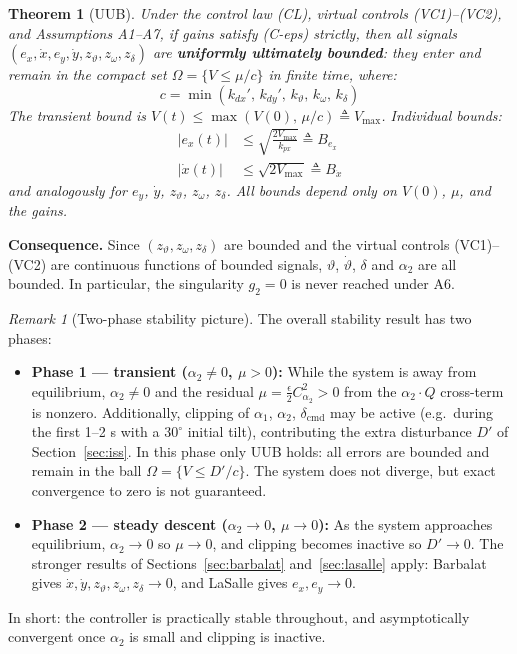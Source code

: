 \documentclass[11pt,a4paper]{article}
\theoremstyle{plain}
\newtheorem{theorem}{Theorem}[section]
\theoremstyle{remark}
\newtheorem{remark}{Remark}[section]
\newcommand{\vth}{\vartheta}
\newcommand{\zth}{z_{\vth}}
\newcommand{\zom}{z_{\omega}}
\newcommand{\zdel}{z_{\delta}}
\newcommand{\dcmd}{\delta_{\mathrm{cmd}}}
\begin{document}
\begin{theorem}[UUB]
Under the control law (CL), virtual controls (VC1)--(VC2), and Assumptions A1--A7, if gains satisfy (C-eps) strictly, then all signals $(e_x, \dot x, e_y, \dot y, \zth, \zom, \zdel)$ are \textbf{uniformly ultimately bounded}: they enter and remain in the compact set $\Omega = \{V \leq \mu/c\}$ in finite time, where:
\[
  c = \min(k_{dx}',\, k_{dy}',\, k_\vth,\, k_\omega,\, k_\delta)
\]
The transient bound is $V(t) \leq \max(V(0),\, \mu/c) \triangleq V_{\max}$. Individual bounds:
\begin{align}
  |e_x(t)| &\leq \sqrt{\frac{2V_{\max}}{k_{px}}} \triangleq B_{e_x} \\
  |\dot x(t)| &\leq \sqrt{2V_{\max}} \triangleq B_{\dot x}
\end{align}
and analogously for $e_y$, $\dot y$, $\zth$, $\zom$, $\zdel$. All bounds depend only on $V(0)$, $\mu$, and the gains.
\end{theorem}

\textbf{Consequence.} Since $(\zth, \zom, \zdel)$ are bounded and the virtual controls (VC1)--(VC2) are continuous functions of bounded signals, $\vth$, $\dot\vth$, $\delta$ and $\alpha_2$ are all bounded. In particular, the singularity $g_2 = 0$ is never reached under A6.

\begin{remark}[Two-phase stability picture]
The overall stability result has two phases:
\begin{itemize}
  \item \textbf{Phase 1 --- transient ($\alpha_2 \neq 0$, $\mu > 0$):} While the system is away from equilibrium, $\alpha_2 \neq 0$ and the residual $\mu = \tfrac{\epsilon}{2}C_{\alpha_2}^2 > 0$ from the $\alpha_2 \cdot Q$ cross-term is nonzero. Additionally, clipping of $\alpha_1$, $\alpha_2$, $\dcmd$ may be active (e.g.\ during the first 1--2 s with a $30^{\circ}$ initial tilt), contributing the extra disturbance $D'$ of Section~\ref{sec:iss}. In this phase only UUB holds: all errors are bounded and remain in the ball $\Omega = \{V \leq D'/c\}$. The system does not diverge, but exact convergence to zero is not guaranteed.
  \item \textbf{Phase 2 --- steady descent ($\alpha_2 \to 0$, $\mu \to 0$):} As the system approaches equilibrium, $\alpha_2 \to 0$ so $\mu \to 0$, and clipping becomes inactive so $D' \to 0$. The stronger results of Sections~\ref{sec:barbalat} and~\ref{sec:lasalle} apply: Barbalat gives $\dot x, \dot y, \zth, \zom, \zdel \to 0$, and LaSalle gives $e_x, e_y \to 0$.
\end{itemize}
In short: the controller is practically stable throughout, and asymptotically convergent once $\alpha_2$ is small and clipping is inactive.
\end{remark}
\end{document}
